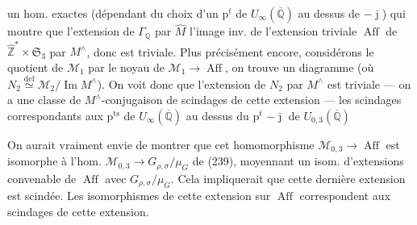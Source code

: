 un hom.  exactes
(dépendant du choix d'un $\mathrm p^{t}$ de $U_\infty(\overline{\mathbb Q})$
au dessus de $-\bar{\jmath}$)
qui montre que l'extension  de
$\Gamma_{\mathbb Q}$ par $\widehat M$
 l'image inv. de l'extension triviale
$\operatorname{Aff}$ de $\widehat{\mathbb Z}^{*}\times\mathfrak S_3$
par $M^\wedge$, donc est triviale.
Plus précisément encore, considérons le quotient 
de $\mathcal M_1$ par le noyau de $\mathcal M_1\longrightarrow\operatorname{Aff}$,
on trouve un diagramme
(où $N_2\overset{\mathrm{def}}{\simeq}\mathcal M_2/\operatorname{Im}M^\wedge$).
On voit donc que l'extension de $N_2$ par $M^\wedge$ est triviale
--- on a une classe de $M^\wedge$-conjugaison de scindages de cette
extension --- les scindages correspondants aux $\mathrm p^{\mathrm{ts}}$ de
$U_\infty(\overline{\mathbb Q})$ au dessus du $\mathrm p^t$
$-\bar{\jmath}$ de $U_{0,3}(\overline{\mathbb Q})$



On aurait vraiment envie de montrer que cet homomorphisme
$\mathcal M_{0,3}\longrightarrow\operatorname{Aff}$ est isomorphe
à l'hom. $\mathcal M_{0,3}\longrightarrow G_{\rho,\sigma}/\mu_G$
de (239), moyennant un isom. d'extensions convenable de
$\operatorname{Aff}$ avec $G_{\rho,\sigma}/\mu_G$.
Cela impliquerait que cette dernière extension est scindée.
Les isomorphismes de cette extension sur $\operatorname{Aff}$
correspondent  aux scindages de cette extension.


